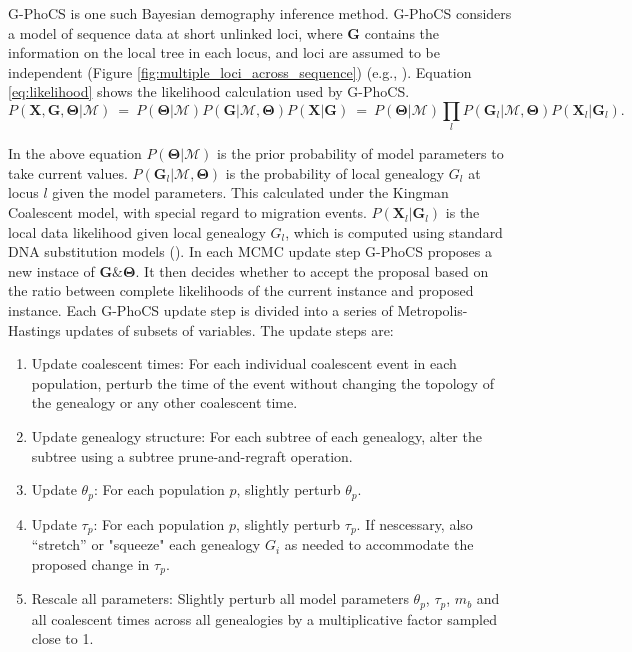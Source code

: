 \documentclass[11pt]{article}
\newcommand{\vect}[1]{\boldsymbol{\mathbf{#1}}}
\newcommand{\X}{\vect{X}}
\newcommand{\M}{\mathcal{M}}
\newcommand{\G}{\vect{G}}
\newcommand{\T}{\vect{\Theta}}
\newcommand{\1}{\mathbbm{1}}
\newcommand{\gp}{G-PhoCS }
\begin{document}
\gp is one such Bayesian demography inference method. \gp considers a model of sequence data at short unlinked loci, where $\G$ contains the information on the local tree in each locus, and loci are assumed to be independent (Figure \ref{fig:multiple_loci_across_sequence}) (e.g., \cite{NIELWAKE01,RANNYANG03,GRONETAL11}).
Equation \ref{eq:likelihood} shows the likelihood calculation used by G-PhoCS.
%
\begin{equation}\label{eq:likelihood}
 P(\X,\G,\T|\M) ~=~ P(\T|\M) P(\G|\M,\T) P(\X|\G) ~=~ P(\T|\M) \prod_l P(\G_l|\M,\T) P(\X_l|\G_l).
\end{equation}

In the above equation $P(\T|\M)$ is the prior probability of model parameters to take current values. $P(\G_l|\M,\T)$ is the probability of local genealogy $G_l$ at locus $l$ given the model parameters. This calculated under the Kingman Coalescent model, with special regard to migration events. $P(\X_l|\G_l)$ is the local data likelihood given local genealogy $G_l$, which is computed using standard DNA substitution models (\cite{JUKECANT69}).
%
In each MCMC update step \gp proposes a new instace of $\G \& \T$. It then decides whether to accept the proposal based on the ratio between complete likelihoods of the current instance and proposed instance.
%
Each \gp update step is divided into a series of
Metropolis-Hastings updates of subsets of variables. The update steps are:

\begin{enumerate}
\item Update coalescent times: For each individual coalescent event in each population, perturb the time of the event without changing the topology of the genealogy or any other coalescent time. 

\item Update genealogy structure: For each subtree of each genealogy, alter the subtree using a subtree prune-and-regraft operation. 

\item Update $\theta_p$: For each population $p$, slightly perturb $\theta_p$.

\item Update $\tau_p$: For each population $p$, slightly perturb $\tau_p$. If nescessary, also “stretch” or "squeeze" each genealogy $G_i$ as needed to accommodate the proposed change in $\tau_p$. 
%

\item Rescale all parameters: Slightly perturb all model parameters ${\theta_p}$, ${\tau_p}$, ${m_b}$ and all coalescent
times across all genealogies by a multiplicative factor sampled close to 1.

\end{enumerate}
\end{document}

